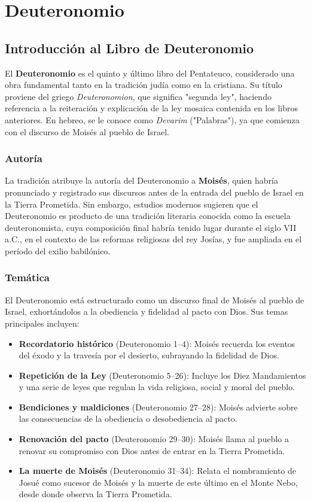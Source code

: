 \chapter{Deuteronomio}


\section*{Introducción al Libro de Deuteronomio}

El \textbf{Deuteronomio} es el quinto y último libro del Pentateuco, considerado una obra fundamental tanto en la tradición judía como en la cristiana. Su título proviene del griego \textit{Deuteronomion}, que significa "segunda ley", haciendo referencia a la reiteración y explicación de la ley mosaica contenida en los libros anteriores. En hebreo, se le conoce como \textit{Devarim} ("Palabras"), ya que comienza con el discurso de Moisés al pueblo de Israel.

\subsection*{Autoría}

La tradición atribuye la autoría del Deuteronomio a \textbf{Moisés}, quien habría pronunciado y registrado sus discursos antes de la entrada del pueblo de Israel en la Tierra Prometida. Sin embargo, estudios modernos sugieren que el Deuteronomio es producto de una tradición literaria conocida como la escuela deuteronomista, cuya composición final habría tenido lugar durante el siglo VII a.C., en el contexto de las reformas religiosas del rey Josías, y fue ampliada en el período del exilio babilónico.

\subsection*{Temática}

El Deuteronomio está estructurado como un discurso final de Moisés al pueblo de Israel, exhortándolos a la obediencia y fidelidad al pacto con Dios. Sus temas principales incluyen:
\begin{itemize}
	\item \textbf{Recordatorio histórico} (Deuteronomio 1–4): Moisés recuerda los eventos del éxodo y la travesía por el desierto, subrayando la fidelidad de Dios.
	\item \textbf{Repetición de la Ley} (Deuteronomio 5–26): Incluye los Diez Mandamientos y una serie de leyes que regulan la vida religiosa, social y moral del pueblo.
	\item \textbf{Bendiciones y maldiciones} (Deuteronomio 27–28): Moisés advierte sobre las consecuencias de la obediencia o desobediencia al pacto.
	\item \textbf{Renovación del pacto} (Deuteronomio 29–30): Moisés llama al pueblo a renovar su compromiso con Dios antes de entrar en la Tierra Prometida.
	\item \textbf{La muerte de Moisés} (Deuteronomio 31–34): Relata el nombramiento de Josué como sucesor de Moisés y la muerte de este último en el Monte Nebo, desde donde observa la Tierra Prometida.
\end{itemize}



